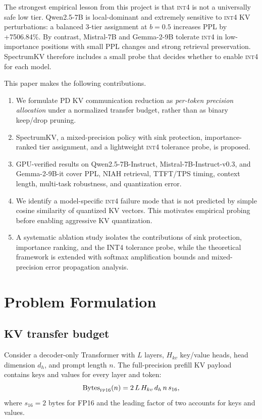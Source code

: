 \documentclass[11pt]{article}
\newcommand{\method}{SpectrumKV}
\newcommand{\niah}{NIAH}
\newcommand{\budget}{b}
\newcommand{\pct}{\%}
\newcommand{\fp}{\textsc{fp16}}
\newcommand{\intiv}{\textsc{int4}}
\theoremstyle{plain}
\theoremstyle{definition}
\begin{document}
The strongest empirical lesson from this project is that \intiv{} is not a universally safe low tier.  Qwen2.5-7B is local-dominant and extremely sensitive to \intiv{} KV perturbations: a balanced 3-tier assignment at $\budget=0.5$ increases PPL by +7506.84\pct{}.  By contrast, Mistral-7B and Gemma-2-9B tolerate \intiv{} in low-importance positions with small PPL changes and strong retrieval preservation.  \method{} therefore includes a small probe that decides whether to enable \intiv{} for each model.

This paper makes the following contributions.
\begin{enumerate}[leftmargin=1.6em,itemsep=2pt]
    \item We formulate PD KV communication reduction as \emph{per-token precision allocation} under a normalized transfer budget, rather than as binary keep/drop pruning.
    \item \method{}, a mixed-precision policy with sink protection, importance-ranked tier assignment, and a lightweight \intiv{} tolerance probe, is proposed.
    \item GPU-verified results on Qwen2.5-7B-Instruct, Mistral-7B-Instruct-v0.3, and Gemma-2-9B-it cover PPL, \niah{} retrieval, TTFT/TPS timing, context length, multi-task robustness, and quantization error.
    \item We identify a model-specific \intiv{} failure mode that is not predicted by simple cosine similarity of quantized KV vectors.  This motivates empirical probing before enabling aggressive KV quantization.
    \item A systematic ablation study isolates the contributions of sink protection, importance ranking, and the INT4 tolerance probe, while the theoretical framework is extended with softmax amplification bounds and mixed-precision error propagation analysis.
\end{enumerate}

\section{Problem Formulation}
\label{sec:formulation}

\subsection{KV transfer budget}
Consider a decoder-only Transformer with $L$ layers, $H_{kv}$ key/value heads, head dimension $d_h$, and prompt length $n$.  The full-precision prefill KV payload contains keys and values for every layer and token:
\begin{equation}
  \mathrm{Bytes}_{\fp{}}(n)= 2\,L\,H_{kv}\,d_h\,n\,s_{16},
  \label{eq:fullbytes}
\end{equation}
where $s_{16}=2$ bytes for FP16 and the leading factor of two accounts for keys and values.
\end{document}
